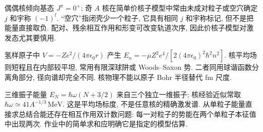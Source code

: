 偶偶核倾向基态 $J^\pi=0^+$; 奇 $A$ 核在简单价核子模型中常由未成对粒子或空穴确定 $j$ 和宇称 $(-1)^l$. ``空穴''指闭壳少一个粒子, 它具有相同 $j$ 和宇称标记, 但不是把能量直接取负. 配对、残余相互作用和形变可改变轨道次序, 因此价核子模型对激发态尤其要慎用.

氢样原子中 $V=-Ze^2/(4\pi\epsilon_0r)$ 产生 $E_n=-\mu Z^2e^4/[2(4\pi\epsilon_0)^2\hbar^2n^2]$. 核平均场则短程且在内部较平坦, 常用有限深球阱或 Woods--Saxon 势. 二者同用球谐函数分离角部分, 径向谱却完全不同. 核物理不能以原子 Bohr 半径替代 fm 尺度.

三维振子能量 $E_N=\hbar\omega(N+3/2)$ 来自三个独立一维振子; 核经验近似常取 $\hbar\omega\simeq41A^{-1/3}\,\mathrm{MeV}$. 这是平均场标度, 不是任意核的精确激发谱. 从单粒子能量直接求总结合能还存在相互作用双计数问题: 每一对粒子的势能在两个单粒子本征值中出现两次. 作业中的简单求和应明确它是指定的模型估算.
